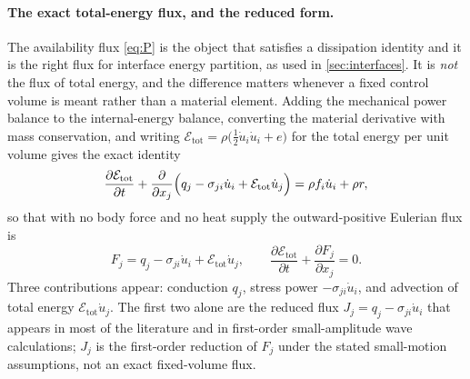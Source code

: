 
\paragraph{The exact total-energy flux, and the reduced form.}
The availability flux \eqref{eq:P} is the object that satisfies a dissipation identity and it is the
right flux for interface energy partition, as used in \cref{sec:interfaces}. It is \emph{not} the flux of
total energy, and the difference matters whenever a fixed control volume is meant rather than a material
element. Adding the mechanical power balance to the internal-energy balance, converting the material
derivative with mass conservation, and writing $\mathcal E_{\mathrm{tot}}=\rho\bigl(\tfrac12\dot
u_i\dot u_i+e\bigr)$ for the total energy per unit volume gives the exact identity
\begin{equation}\label{eq:exactflux}
\frac{\partial \mathcal E_{\mathrm{tot}}}{\partial t}
+\frac{\partial}{\partial x_j}\Bigl(q_j-\sigma_{ji}\dot u_i+\mathcal E_{\mathrm{tot}}\dot u_j\Bigr)
=\rho f_i\dot u_i+\rho r ,
\end{equation}
so that with no body force and no heat supply the outward-positive Eulerian flux is
\begin{equation}\label{eq:exactflux-balance}
F_j=q_j-\sigma_{ji}\dot u_i+\mathcal E_{\mathrm{tot}}\dot u_j,
\qquad
\frac{\partial \mathcal E_{\mathrm{tot}}}{\partial t}+\frac{\partial F_j}{\partial x_j}=0 .
\end{equation}
Three contributions appear: conduction $q_j$, stress power $-\sigma_{ji}\dot u_i$, and advection of
total energy $\mathcal E_{\mathrm{tot}}\dot u_j$. The first two alone are the reduced flux
$J_j=q_j-\sigma_{ji}\dot u_i$ that appears in most of the literature and in first-order small-amplitude
wave calculations; $J_j$ is the first-order reduction of $F_j$ under the stated small-motion
assumptions, not an exact fixed-volume flux.

